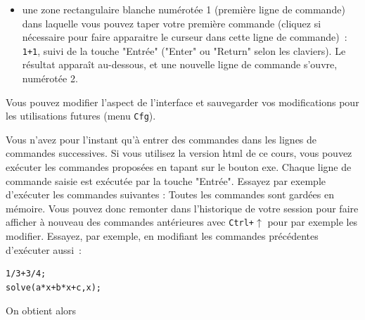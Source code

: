 \documentclass{article}
\begin{document}
\begin{giacjshere}
\begin{itemize}
\begin{itemize}
\verb|Config: exact real ...| et permettant de la modifier,
\item un bouton rouge \verb|STOP| permettant d'interrompre un calcul trop long,
\item un bouton \verb|Kbd| pour faire apparaitre un clavier ressemblant \`a 
celui d'une calculatrice (on peut le voir ci-dessus). Il peut faciliter vos 
saisies, peut faire afficher une fen\^etre de messages avec touche 
{\tt Kbd->msg} (ou avec le menu {\tt Cfg->Montrer->msg}) et afficher le bandeau 
des commandes avec la touche {\tt Kbd->cmds} (ou avec le menu 
{\tt Cfg->Montrer->bandeau}) 
\item  un bouton \verb|x| pour fermer la session,
\end{itemize}
\item
une zone rectangulaire blanche num\'erot\'ee 1 (premi\`ere ligne
de commande) dans laquelle vous pouvez taper
votre premi\`ere commande (cliquez si n\'ecessaire pour faire
apparaitre le curseur dans
cette ligne de commande)~: \verb|1+1|, suivi de la touche
"Entr\'ee" ("Enter" ou "Return" selon les claviers).
Le r\'esultat appara\^it au-dessous, et une nouvelle ligne de commande
s'ouvre, num\'erot\'ee 2. 
\end{itemize}
Vous pouvez modifier l'aspect de l'interface et sauvegarder vos
modifications pour les utilisations futures (menu \verb|Cfg|).

Vous n'avez pour l'instant qu'\`a
entrer des commandes dans les lignes de commandes successives. 
Si vous utilisez la
version html de ce cours, vous pouvez ex\'ecuter les commandes
propos\'ees en tapant sur le bouton exe. 
Chaque ligne de commande saisie est ex\'ecut\'ee par la
touche "Entr\'ee". Essayez par exemple d'ex\'ecuter les
commandes suivantes :
Toutes les commandes sont gard\'ees en m\'emoire.
Vous pouvez donc remonter dans l'historique de votre session pour faire 
afficher \`a nouveau des commandes ant\'erieures avec {\tt Ctrl+$\uparrow$}
pour par exemple les modifier. Essayez, par exemple, en modifiant les 
commandes pr\'ec\'edentes d'ex\'ecuter aussi~:
\begin{verbatim}
1/3+3/4;
solve(a*x+b*x+c,x);
\end{verbatim}
On obtient alors 


\end{giacjshere}
\end{document}
